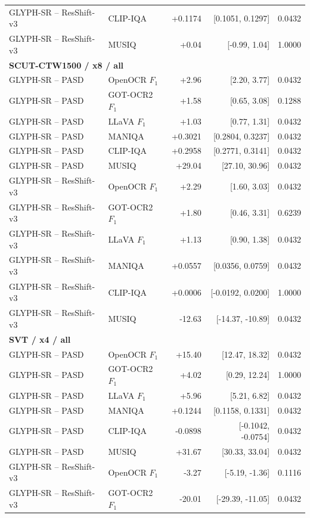 \begin{longtable}{llrrr}
GLYPH-SR -- ResShift-v3 & CLIP-IQA & +0.1174 & [0.1051, 0.1297] & 0.0432 \\
GLYPH-SR -- ResShift-v3 & MUSIQ & +0.04 & [-0.99, 1.04] & 1.0000 \\
\midrule
\multicolumn{5}{l}{\textbf{SCUT-CTW1500 / x8 / all}}\\
\midrule
GLYPH-SR -- PASD & OpenOCR $F_1$ & +2.96 & [2.20, 3.77] & 0.0432 \\
GLYPH-SR -- PASD & GOT-OCR2 $F_1$ & +1.58 & [0.65, 3.08] & 0.1288 \\
GLYPH-SR -- PASD & LLaVA $F_1$ & +1.03 & [0.77, 1.31] & 0.0432 \\
GLYPH-SR -- PASD & MANIQA & +0.3021 & [0.2804, 0.3237] & 0.0432 \\
GLYPH-SR -- PASD & CLIP-IQA & +0.2958 & [0.2771, 0.3141] & 0.0432 \\
GLYPH-SR -- PASD & MUSIQ & +29.04 & [27.10, 30.96] & 0.0432 \\
GLYPH-SR -- ResShift-v3 & OpenOCR $F_1$ & +2.29 & [1.60, 3.03] & 0.0432 \\
GLYPH-SR -- ResShift-v3 & GOT-OCR2 $F_1$ & +1.80 & [0.46, 3.31] & 0.6239 \\
GLYPH-SR -- ResShift-v3 & LLaVA $F_1$ & +1.13 & [0.90, 1.38] & 0.0432 \\
GLYPH-SR -- ResShift-v3 & MANIQA & +0.0557 & [0.0356, 0.0759] & 0.0432 \\
GLYPH-SR -- ResShift-v3 & CLIP-IQA & +0.0006 & [-0.0192, 0.0200] & 1.0000 \\
GLYPH-SR -- ResShift-v3 & MUSIQ & -12.63 & [-14.37, -10.89] & 0.0432 \\
\midrule
\multicolumn{5}{l}{\textbf{SVT / x4 / all}}\\
\midrule
GLYPH-SR -- PASD & OpenOCR $F_1$ & +15.40 & [12.47, 18.32] & 0.0432 \\
GLYPH-SR -- PASD & GOT-OCR2 $F_1$ & +4.02 & [0.29, 12.24] & 1.0000 \\
GLYPH-SR -- PASD & LLaVA $F_1$ & +5.96 & [5.21, 6.82] & 0.0432 \\
GLYPH-SR -- PASD & MANIQA & +0.1244 & [0.1158, 0.1331] & 0.0432 \\
GLYPH-SR -- PASD & CLIP-IQA & -0.0898 & [-0.1042, -0.0754] & 0.0432 \\
GLYPH-SR -- PASD & MUSIQ & +31.67 & [30.33, 33.04] & 0.0432 \\
GLYPH-SR -- ResShift-v3 & OpenOCR $F_1$ & -3.27 & [-5.19, -1.36] & 0.1116 \\
GLYPH-SR -- ResShift-v3 & GOT-OCR2 $F_1$ & -20.01 & [-29.39, -11.05] & 0.0432 \\

\end{longtable}
